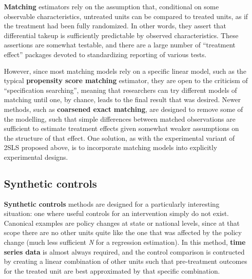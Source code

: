 \textbf{Matching} estimators rely on the assumption that,
conditional on some observable characteristics,
untreated units can be compared to treated units,
as if the treatment had been fully randomized.
In other words, they assert that differential takeup
is sufficiently predictable by observed characteristics.
These assertions are somewhat testable,
and there are a large number of ``treatment effect''
packages devoted to standardizing reporting of various tests.

However, since most matching models rely on a specific linear model,
such as the typical \textbf{propensity score matching} estimator,
they are open to the criticism of ``specification searching'',
meaning that researchers can try different models of matching
until one, by chance, leads to the final result that was desired.
Newer methods, such as \textbf{coarsened exact matching},\cite{iacus2012causal}
are designed to remove some of the modelling,
such that simple differences between matched observations
are sufficient to estimate treatment effects
given somewhat weaker assumptions on the structure of that effect.
One solution, as with the experimental variant of 2SLS proposed above,
is to incorporate matching models into explicitly experimental designs.

\subsection{Synthetic controls}

\textbf{Synthetic controls} methods\cite{abadie2015comparative}
are designed for a particularly interesting situation:
one where useful controls for an intervention simply do not exist.
Canonical examples are policy changes at state or national levels,
since at that scope there are no other units quite like
the one that was affected by the policy change
(much less sufficient \textit{N} for a regression estimation).\cite{gobillon2016regional}
In this method, \textbf{time series data} is almost always required,
and the control comparison is contructed by creating
a linear combination of other units such that pre-treatment outcomes
for the treated unit are best approximated by that specific combination.
